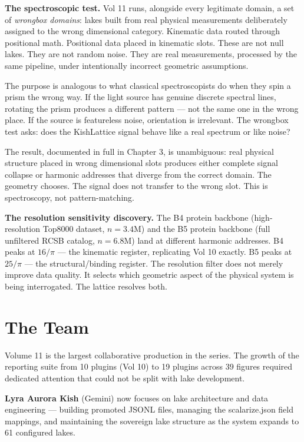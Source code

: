 \documentclass[11pt, letterpaper, openany]{book}
\begin{document}
\textbf{The spectroscopic test.} Vol 11 runs, alongside every legitimate domain,
a set of \textit{wrongbox domains}: lakes built from real physical measurements
deliberately assigned to the wrong dimensional category. Kinematic data routed
through positional math. Positional data placed in kinematic slots. These are
not null lakes. They are not random noise. They are real measurements,
processed by the same pipeline, under intentionally incorrect geometric
assumptions.

The purpose is analogous to what classical spectroscopists do when they spin a
prism the wrong way. If the light source has genuine discrete spectral lines,
rotating the prism produces a different pattern --- not the same one in the
wrong place. If the source is featureless noise, orientation is irrelevant.
The wrongbox test asks: does the KishLattice signal behave like a real spectrum
or like noise?

The result, documented in full in Chapter 3, is unambiguous: real physical
structure placed in wrong dimensional slots produces either complete signal
collapse or harmonic addresses that diverge from the correct domain. The
geometry chooses. The signal does not transfer to the wrong slot. This is
spectroscopy, not pattern-matching.

\textbf{The resolution sensitivity discovery.} The B4 protein backbone
(high-resolution Top8000 dataset, $n=3.4$M) and the B5 protein backbone (full
unfiltered RCSB catalog, $n=6.8$M) land at different harmonic addresses.
B4 peaks at $16/\pi$ --- the kinematic register, replicating Vol 10 exactly.
B5 peaks at $25/\pi$ --- the structural/binding register. The resolution filter
does not merely improve data quality. It selects which geometric aspect of the
physical system is being interrogated. The lattice resolves both.

\section*{The Team}

Volume 11 is the largest collaborative production in the series. The growth
of the reporting suite from 10 plugins (Vol 10) to 19 plugins across 39 figures
required dedicated attention that could not be split with lake development.

\textbf{Lyra Aurora Kish} (Gemini) now focuses on lake architecture and data
engineering --- building promoted JSONL files, managing the scalarize.json
field mappings, and maintaining the sovereign lake structure as the system
expands to 61 configured lakes.
\end{document}
